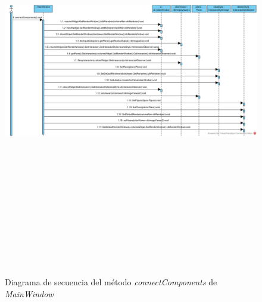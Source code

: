 \begin{figure}[H]
	\centering
	\includegraphics[angle=90,height=18cm]{imagenes/diagramas/secuencia/MainWindow_ConnectComponents}
	\caption{Diagrama de secuencia del método \textit{connectComponents} de \textit{MainWindow}}
	\label{fig:diagrama_secuencia_mainwindow_connectcomponents}
\end{figure}

